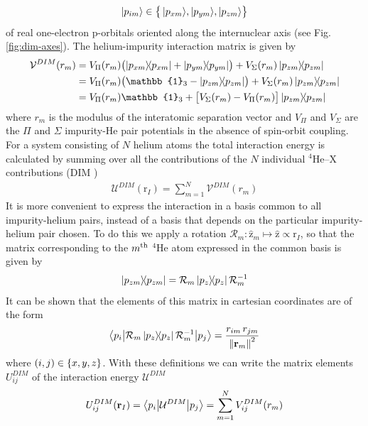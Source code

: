 \documentclass[12pt,a4paper,twosides]{book}
\renewcommand{\vec}[1]{\bm{\mathrm{#1}}}
\begin{document}
			\begin{align}
				 \ket{p_{im}}\in\qty\big{\,\ket{p_{xm}}\!,\ket{p_{ym}}\!,\ket{p_{zm}}} \label{eq:dim-basis}
			\end{align}
			of real one-electron p-orbitals oriented along the internuclear axis (see Fig. \ref{fig:dim-axes}). The helium-impurity interaction matrix is given by
			\begin{align}
				\mathcal{V}^{DIM}(r_m) &= V_{\Pi}(r_m)\qty\big(\dyad{p_{xm}}+\dyad{p_{ym}})+V_{\Sigma}(r_m)\dyad{p_{zm}} \nonumber \\
					&= V_{\Pi}(r_m)\qty\big(\mathbb{1}_3-\dyad{p_{zm}})+V_{\Sigma}(r_m)\dyad{p_{zm}} \nonumber \\
					&=V_{\Pi}(r_m)\mathbb{1}_3+\qty\big[V_{\Sigma}(r_m)-V_{\Pi}(r_m)]\dyad{p_{zm}}
			\end{align}	
			where $r_m$ is the modulus of the interatomic separation vector and $V_\Pi$ and $V_\Sigma$ are the $\Pi$ and $\Sigma$ impurity-He pair potentials in the absence of spin-orbit coupling. For a system consisting of $N$ helium atoms the total interaction energy is calculated by summing over all the contributions of the $N$ individual $^4$He--X contributions (DIM \cite{82})
			\begin{align}
				\mathcal{U}^{DIM}(\vec{r}_I)=\sum_{m=1}^{N}\mathcal{V}^{DIM}(r_m)
			\end{align}
			It is more convenient to express the interaction in a basis common to all impurity-helium pairs, instead of a basis that depends on the particular impurity-helium pair chosen. To do this we apply a rotation $\mathcal{R}_m:\hat{\vec{z}}_m\mapsto\hat{\vec{z}}\propto\vec{r}_I$, so that the matrix corresponding to the $m^{\rm th}$ $^4$He atom expressed in the common basis is given by
			\begin{align}
				\dyad{p_{zm}} = \mathcal{R}_m\dyad{p_z}\mathcal{R}_m^{-1}
			\end{align}
			It can be shown that the elements of this matrix in cartesian coordinates are of the form
			\begin{equation}
				\mel**{p_i}{\mathcal{R}_m\dyad{p_z}\mathcal{R}_m^{-1}}{p_j} = \frac{r_{im}\,r_{jm}}{\norm{\vec{r}_m}^2}		\label{eq39}
			\end{equation}	
			where $(i,j)\in\qty{x,y,z}$. With these definitions we can write the matrix elements $U^{DIM}_{ij}$ of the interaction energy $\mathcal{U}^{DIM}$
			\begin{align}
				U^{DIM}_{ij}(\vec{r}_I)=\mel**{p_i}{\mathcal{U}^{DIM}}{p_j} = \sum_{m=1}^{N} V^{DIM}_{ij}(r_m)
			\end{align}
\end{document}

